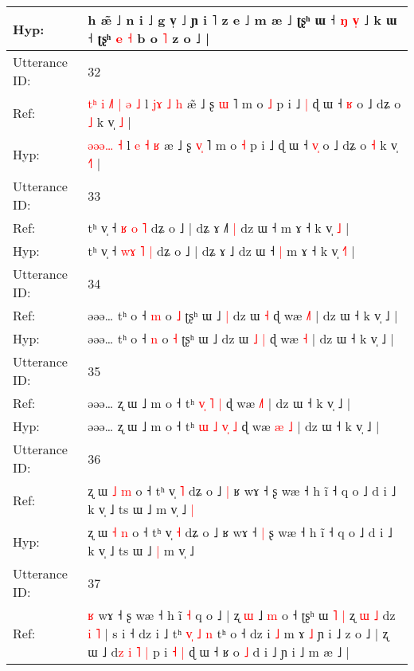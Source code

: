 \documentclass[10pt]{article}
\DeclareRobustCommand{\hl}[1]{{\textcolor{red}{#1}}}
\begin{document}
\begin{longtable}{ll}
 \\
Hyp: & h æ̃ ˩ n i ˩ g v̩ ˩ ɲ i ˥ z e ˩ m æ ˩\hl{}\hl{} ʈʂʰ ɯ ˧ \hl{ŋ} \hl{}\hl{v}\hl{̩} ˩ k ɯ ˧ ʈʂʰ\hl{}\hl{} \hl{e} \hl{˧} b o \hl{˥} z o ˩ |
 \\
\midrule
Utterance ID: & 32 \\
Ref: & \hl{t}\hl{ʰ}\hl{ }\hl{i}\hl{ }\hl{˩}\hl{˥}\hl{ }\hl{|}\hl{ }\hl{ə} \hl{˩} l \hl{j}\hl{ɤ} \hl{˩} \hl{h} æ\hl{̃} ˩ ʂ \hl{}\hl{ɯ} ˥ m o \hl{˩} p i ˩\hl{ }\hl{|} ɖ ɯ ˧ \hl{}\hl{ʁ} o ˩ dʑ o \hl{˩} k v̩ \hl{}\hl{˩} |
 \\
Hyp: & \hl{}\hl{}\hl{}\hl{}\hl{}\hl{}\hl{}\hl{ə}\hl{ə}\hl{ə}\hl{…} \hl{˧} l \hl{}\hl{e} \hl{˧} \hl{ʁ} æ\hl{} ˩ ʂ \hl{v}\hl{̩} ˥ m o \hl{˧} p i ˩\hl{}\hl{} ɖ ɯ ˧ \hl{v}\hl{̩} o ˩ dʑ o \hl{˧} k v̩ \hl{˧}\hl{˥} |
 \\
\midrule
Utterance ID: & 33 \\
Ref: & tʰ v̩ ˧ \hl{}\hl{ʁ} \hl{o} \hl{˥} dʑ o ˩ | dʑ ɤ ˩\hl{˥}\hl{ }\hl{|} dz ɯ ˧\hl{}\hl{} m ɤ ˧ k v̩ \hl{}\hl{˩} |
 \\
Hyp: & tʰ v̩ ˧ \hl{w}\hl{ɤ} \hl{˥} \hl{|} dʑ o ˩ | dʑ ɤ ˩\hl{}\hl{}\hl{} dz ɯ ˧\hl{ }\hl{|} m ɤ ˧ k v̩ \hl{˧}\hl{˥} |
 \\
\midrule
Utterance ID: & 34 \\
Ref: & əəə… tʰ o ˧ \hl{m} o \hl{˩} ʈʂʰ ɯ ˩\hl{ }\hl{|} dz ɯ\hl{}\hl{} \hl{˧} ɖ wæ \hl{˩}\hl{˥} | dz ɯ ˧ k v̩ ˩ |
 \\
Hyp: & əəə… tʰ o ˧ \hl{n} o \hl{˧} ʈʂʰ ɯ ˩\hl{}\hl{} dz ɯ\hl{ }\hl{˩} \hl{|} ɖ wæ \hl{}\hl{˧} | dz ɯ ˧ k v̩ ˩ |
 \\
\midrule
Utterance ID: & 35 \\
Ref: & əəə… ʐ ɯ ˩ m o ˧ tʰ \hl{}\hl{v}\hl{̩} \hl{}\hl{˥} \hl{|} ɖ wæ \hl{}\hl{˩}\hl{˥} | dz ɯ ˧ k v̩ ˩ |
 \\
Hyp: & əəə… ʐ ɯ ˩ m o ˧ tʰ \hl{ɯ}\hl{ }\hl{˩} \hl{v}\hl{̩} \hl{˩} ɖ wæ \hl{æ}\hl{ }\hl{˩} | dz ɯ ˧ k v̩ ˩ |
 \\
\midrule
Utterance ID: & 36 \\
Ref: & ʐ ɯ \hl{˩} \hl{m} o ˧ tʰ v̩ \hl{˥} dʑ o ˩\hl{ }\hl{|} ʁ wɤ ˧\hl{}\hl{} ʂ wæ ˧ h ĩ ˧ q o ˩ d i ˩ k v̩ ˩ ts ɯ ˩\hl{}\hl{} m v̩ ˩\hl{ }\hl{|}
 \\
Hyp: & ʐ ɯ \hl{˧} \hl{n} o ˧ tʰ v̩ \hl{˧} dʑ o ˩\hl{}\hl{} ʁ wɤ ˧\hl{ }\hl{|} ʂ wæ ˧ h ĩ ˧ q o ˩ d i ˩ k v̩ ˩ ts ɯ ˩\hl{ }\hl{|} m v̩ ˩\hl{}\hl{}
 \\
\midrule
Utterance ID: & 37 \\
Ref: & \hl{}\hl{ʁ} wɤ ˧\hl{}\hl{} ʂ wæ ˧ h ĩ \hl{˧} q o ˩ | ʐ \hl{}\hl{ɯ} ˩ \hl{m} o ˧ ʈʂʰ ɯ\hl{ }\hl{˥} \hl{|} ʐ\hl{ }\hl{ɯ}\hl{ }\hl{˩} dz \hl{i} \hl{˥} | s i ˧ dz i ˩ tʰ\hl{}\hl{} \hl{}\hl{v}\hl{̩} \hl{˩} \hl{n} tʰ o ˧ dz i \hl{˩} m ɤ \hl{˩} ɲ i ˩ z o ˩ | ʐ ɯ ˩ d\hl{z}\hl{ }\hl{i} \hl{˥} \hl{|} p i\hl{ }\hl{˧} \hl{|} ɖ ɯ ˧ ʁ o \hl{˩} d i ˩ ɲ i ˩ m æ ˩ |

\end{longtable}
\end{document}
